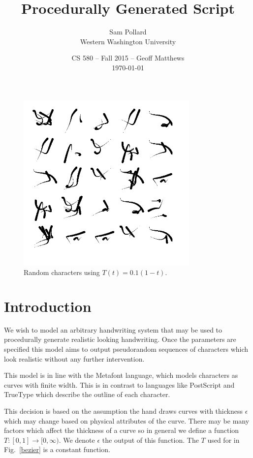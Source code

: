 \documentclass[12pt]{article}
\title{Procedurally Generated Script}
\author{Sam Pollard \\ Western Washington University}
\date{CS 580 -- Fall 2015 -- Geoff Matthews \\ \today}
\begin{document}
\maketitle

\begin{figure}[ht]
	\vspace{-30pt}
	\centering
	\includegraphics[width=3.5in]{sample.png}
	\vspace{-18pt}
	\caption{Random characters using $T(t) = 0.1(1-t)$.}
	\label{sample}
\end{figure}

\section{Introduction}
We wish to model an arbitrary handwriting system that may be used to procedurally generate realistic looking handwriting. Once the parameters are specified this model aims to output pseudorandom sequences of characters which look realistic without any further intervention.

This model is in line with the Metafont language, which models characters as curves with finite width. This is in contrast to languages like PostScript and TrueType which describe the outline of each character.

This decision is based on the assumption the hand draws curves with thickness $\epsilon$ which may change based on physical attributes of the curve. There may be many factors which affect the thickness of a curve so in general we define a function $T : [0,1] \to [0,\infty)$. We denote $\epsilon$ the output of this function. The $T$ used for in Fig.~\ref{bezier} is a constant function.
\end{document}
